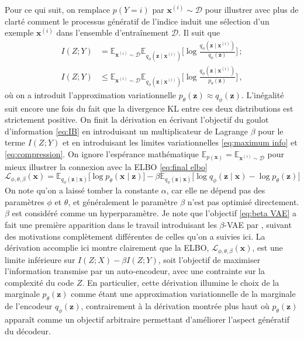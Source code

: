 Pour ce qui suit, on remplace $p(Y=i)$ par $\mathbf{x}^{(i)} \sim \mathcal{D}$ pour illustrer avec plus de clarté 
comment le processus génératif de l'indice induit une sélection d'un exemple $\mathbf{x}^{(i)}$ dans l'ensemble 
d'entraînement $\mathcal{D}$. Il suit que 
\begin{align}
        I(Z; Y) &= \mathbb{E}_{\mathbf{x}^{(i)} \sim \mathcal{D}} \mathbb{E}_{q_\phi(\mathbf{z} \mid \mathbf{x}^{(i)})} \bigg[ 
                \log \frac{q_\phi(\mathbf{z} \mid \mathbf{x}^{(i)}) }{q_\phi (\mathbf{z})}        
        \bigg]\, ; \\[1.5ex]
        \label{eq:compression}
        I(Z; Y) &\leq \mathbb{E}_{\mathbf{x}^{(i)} \sim \mathcal{D}} \mathbb{E}_{q_\phi(\mathbf{z} \mid \mathbf{x}^{(i)})} \bigg[ 
                \log \frac{q_\phi(\mathbf{z} \mid \mathbf{x}^{(i)}) }{p_\theta (\mathbf{z})}        
        \bigg]\, , 
\end{align}
où on a introduit l'approximation variationnelle $p_\theta(\mathbf{z}) \approx q_\phi(\mathbf{z})$. 
L'inégalité suit encore une fois 
du fait que la divergence KL entre ces deux distributions est strictement positive.
On finit la dérivation en écrivant l'objectif du goulot d'information \eqref{eq:IB} en introduisant un multiplicateur 
de Lagrange $\beta$ pour le terme $I(Z; Y)$ et en introduisant 
les limites variationnelles \eqref{eq:maximum info} et \eqref{eq:compression}. On ignore  
l'espérance mathématique $\mathbb{E}_{p(\mathbf{x})} = \mathbb{E}_{\mathbf{x}^{(i)} \sim \mathcal{D}}$ pour mieux illustrer la connexion 
avec la ELBO \eqref{eq:final elbo}
\begin{equation}\label{eq:beta VAE}
        \mathcal{L}_{\phi,\theta,\beta}(\mathbf{x}) =  \mathbb{E}_{q_\phi(\mathbf{z} \mid \mathbf{x})} \bigg[\log p_\theta (\mathbf{x} \mid \mathbf{z})\bigg]
        -  \beta  \mathbb{E}_{q_\phi(\mathbf{z} \mid \mathbf{x})} \bigg[ 
                \log q_\phi(\mathbf{z} \mid \mathbf{x})        
                -\log p_\theta(\mathbf{z})
                \bigg]
\end{equation} 
On note qu'on a laissé tomber la constante $\alpha$, car elle ne dépend pas des paramètres $\phi$ et $\theta$, et généralement le paramètre $\beta$ 
n'est pas optimisé directement. $\beta$ est considéré comme un hyperparamètre. 
Je note que l'objectif \eqref{eq:beta VAE} a fait une première apparition dans le travail introduisant les $\beta$-VAE par \citet{Higgins2017}, 
suivant des motivations complètement différentes de celles qu'on a suivies ici. La dérivation accomplie ici 
montre clairement que la ELBO, $\mathcal{L}_{\phi,\theta,\beta}(\mathbf{x})$, est une limite inférieure 
sur $I(Z; X) - \beta I(Z; Y)$, soit l'objectif de maximiser l'information transmise par un auto-encodeur, avec une 
contrainte sur la complexité du code $Z$. En particulier, cette dérivation illumine le choix de la marginale $p_\theta(\mathbf{z})$ 
comme étant une approximation variationnelle de la marginale de l'encodeur $q_\phi(\mathbf{z})$, contrairement à la dérivation 
montrée plus haut où $p_\theta(\mathbf{z})$ apparaît comme un objectif arbitraire permettant d'améliorer l'aspect 
génératif du décodeur.

